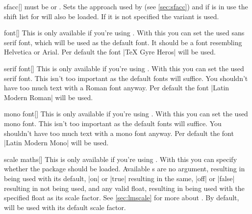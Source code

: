 \begin{describeopt}{sfacc}[]
   must be  or . Sets the approach used by
   (see \autoref{sec:sfacc}) and if  is in use the shift
  list for  will also be loaded. If it is not specified the
   variant is used.
\end{describeopt}
\begin{describeopt}{font}[]
  This is only available if you're using \luaxetex. With this you can set the
  used sans serif font, which will be used as the default font. It should be
  a font resembling Helvetica or Arial. Per default the font
  \bverb|TeX Gyre Heros| will be used.
\end{describeopt}
\begin{describeopt}{serif font}[]
  This is only available if you're using \luaxetex. With this you can set the
  used serif font. This isn't too important as the default fonts will suffice.
  You shouldn't have too much text with a Roman font anyway. Per default the
  font \bverb|Latin Modern Roman| will be used.
\end{describeopt}
\begin{describeopt}{mono font}[]
  This is only available if you're using \luaxetex. With this you can set the
  used mono font. This isn't too important as the default fonts will suffice.
  You shouldn't have too much text with a mono font anyway. Per default the
  font \bverb|Latin Modern Mono| will be used.
\end{describeopt}
\begin{describeopt}{scale maths}[]
  This is only available if you're using . With this you can
  specify whether the  package should be loaded. Available
  s are no argument, resulting in  being used with
  its default, |on| or |true| resulting in the same, |off| or |false| resulting
  in  not being used, and any valid float, resulting in
   being used with the specified float as its scale factor. See
  \autoref{sec:lmscale} for more about . By default,
   will be used with its default scale factor.
\end{describeopt}
